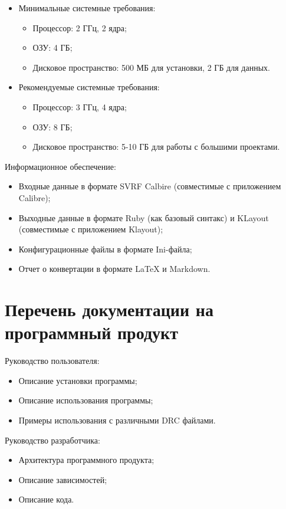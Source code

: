 \begin{itemize}
	\item Минимальные системные требования:
	\begin{itemize}
		\item Процессор: 2 ГГц, 2 ядра;
		\item ОЗУ: 4 ГБ;
		\item Дисковое пространство: 500 МБ для установки, 2 ГБ для данных.
	\end{itemize}
	\item Рекомендуемые системные требования:
	\begin{itemize}
		\item Процессор: 3 ГГц, 4 ядра;
		\item ОЗУ: 8 ГБ;
		\item Дисковое пространство: 5-10 ГБ для работы с большими проектами.
	\end{itemize}
\end{itemize}

Информационное обеспечение:

\begin{itemize}
	\item Входные данные в формате SVRF Calbire
		(совместимые с приложением Calibre);
	\item Выходные данные в формате Ruby (как базовый синтакс)
		и KLayout (совместимые с приложением Klayout);
	\item Конфигурационные файлы в формате Ini-файла;
	\item Отчет о конвертации в формате LaTeX и Markdown.
\end{itemize}

\section{Перечень документации на программный продукт}

Руководство пользователя:

\begin{itemize}
	\item Описание установки программы;
	\item Описание использования программы;
	\item Примеры использования с различными DRC файлами.
\end{itemize}

Руководство разработчика:

\begin{itemize}
	\item Архитектура программного продукта;
	\item Описание зависимостей;
	\item Описание кода.
\end{itemize}

